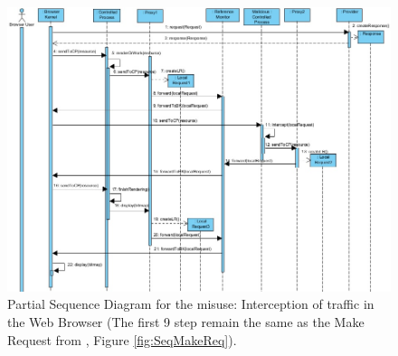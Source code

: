 \documentclass{sig-alternate-05-2015}
\begin{document}
\begin{figure}[h!t]
  \centering
  \includegraphics[scale=0.7]{figures/misuse/MakeRequestMisuse_showOnlyMisuse.jpg}
  \caption{Partial Sequence Diagram for the misuse: Interception of traffic in the Web Browser (The first 9 step remain the same as the Make Request from \cite{silva2015}, Figure \ref{fig:SeqMakeReq}).}
  \label{fig:SeqMisuse}
\end{figure}

\end{document}
